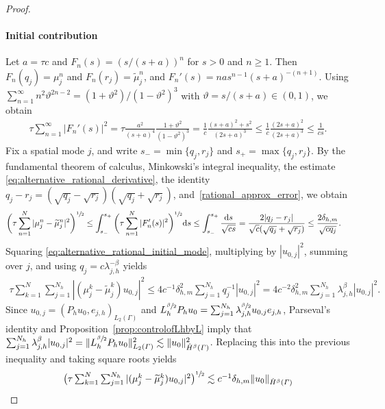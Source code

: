\documentclass[numbers,webpdf]{ima-authoring-template}%
\theoremstyle{thmstyletwo}%
\numberwithin{equation}{section}
\begin{document}
\begin{proof}
    \paragraph{Initial contribution}
    Let $a=\tau c$ and $F_n(s)=(s/(s+a))^n$ for $s>0$ and $n\geq1$. Then $F_n(q_j)= \mu_j^n$ and $F_n(r_j)=\widetilde \mu_j^n$, and $F_n'(s)=na s^{n-1}(s+a)^{-(n+1)}$. Using $\sum_{n=1}^\infty n^2\vartheta^{2n-2}
    =(1+\vartheta^2)/(1-\vartheta^2)^3$ with
    $\vartheta=s/(s+a)\in(0,1)$, we obtain
    \begin{align}
    \label{eq:alternative_rational_derivative}
        \tau\sum_{n=1}^\infty|F_n'(s)|^2 =\tau\frac{a^2}{(s+a)^4}\frac{1+\vartheta^2}{(1-\vartheta^2)^3}
        =\frac1c\frac{(s+a)^2+s^2}{(2s+a)^3}\leq \frac1c\frac{(2s+a)^2}{(2s+a)^3}
        \leq\frac1{cs}.
    \end{align}
    Fix a spatial mode $j$, and write $s_-=\min\{q_j,r_j\}$ and $s_+=\max\{q_j,r_j\}$. By the fundamental theorem of calculus, Minkowski's integral inequality, the estimate \eqref{eq:alternative_rational_derivative}, the identity $q_j-r_j=(\sqrt{q_j}-\sqrt{r_j})(\sqrt{q_j}+\sqrt{r_j})$, and~\eqref{rational_approx_error}, we obtain
    \begin{align}
    \label{eq:alternative_rational_initial_mode}
        \bigg(\tau\sum_{n=1}^N| \mu_j^n-\widetilde \mu_j^n|^2\bigg)^{\sfrac12} &\leq \int_{s_-}^{s_+} \bigg(\tau\sum_{n=1}^N|F_n'(s)|^2\bigg)^{\sfrac12}\dd s\leq\int_{s_-}^{s_+} \frac{\dd s}{\sqrt{cs}} = \frac{2|q_j-r_j|}{\sqrt c(\sqrt{q_j}+\sqrt{r_j})}
        \leq\frac{2\delta_{h,m}}{\sqrt{cq_j}}.
    \end{align}
    Squaring \eqref{eq:alternative_rational_initial_mode}, multiplying by $|u_{0,j}|^2$, summing over $j$, and using $q_j = c\lambda_{j,h}^{-\beta}$ yields
    \begin{align*}
    \textstyle
    \tau\sum_{k=1}^N \sum_{j=1}^{N_h} |( \mu_j^k-\widetilde \mu_j^k)u_{0,j}|^2 \leq4c^{-1}\delta_{h,m}^2 \sum_{j=1}^{N_h} q_j^{-1}|u_{0,j}|^2 = 4c^{-2}\delta_{h,m}^2 \sum_{j=1}^{N_h} \lambda_{j,h}^\beta|u_{0,j}|^2.
    \end{align*}
    Since $u_{0,j}=(P_hu_0,e_{j,h})_{L_2(\Gamma)}$ and $L_h^{\sfrac{\beta}{2}}P_hu_0 =\sum_{j=1}^{N_h} \lambda_{j,h}^{\sfrac{\beta}{2}}u_{0,j}e_{j,h}$, Parseval's identity and Proposition~\ref{prop:controlofLhbyL} imply that $\sum_{j=1}^{N_h}\lambda_{j,h}^\beta|u_{0,j}|^2 = \|L_h^{\sfrac{\beta}{2}}P_hu_0\|_{L_2({\mit\varGamma})}^2 \lesssim \|u_0\|_{\dot H^\beta({\mit\varGamma})}^2$. Replacing this into the previous inequality and taking square roots yields
    \begin{align}
    \label{eq:alternative_rational_initial}
    \textstyle
        \big(\tau\sum_{k=1}^N\sum_{j=1}^{N_h} |( \mu_j^k-\widetilde \mu_j^k)u_{0,j}|^2\big)^{\sfrac12} \lesssim c^{-1}\delta_{h,m} \|u_0\|_{\dot H^\beta({\mit\varGamma})}
    \end{align}


\end{proof}
\end{document}
